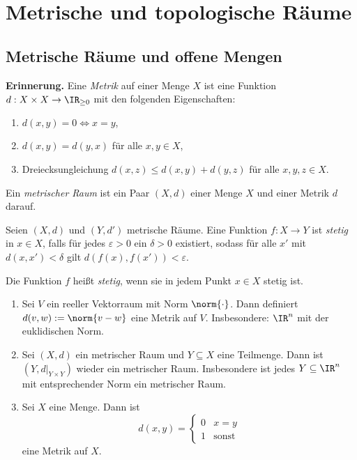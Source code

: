 \documentclass[language=ngerman]{TemplateLecture} %
\begin{document}
\chapter{Metrische und topologische Räume}
\section{Metrische Räume und offene Mengen}


\textbf{Erinnerung.} Eine \emph{Metrik} auf einer Menge $X$ ist eine Funktion $d: X \times X \to \IR_{\geq 0}$ mit den folgenden Eigenschaften:

\begin{enumerate}[$(i)$]
    \item $d(x,y) = 0 \Leftrightarrow x = y$,
    \item $d(x,y) = d(y,x)$ für alle $x,y \in X$,
    \item Dreiecksungleichung $d(x,z) \leq d(x,y) + d(y,z)$ für alle $x,y,z \in X$.
\end{enumerate}
Ein \emph{metrischer Raum} ist ein Paar $(X,d)$ einer Menge $X$ und einer Metrik $d$ darauf.

Seien $(X,d)$ und $(Y,d')$ metrische Räume. Eine Funktion $f: X \to Y$ ist \emph{stetig} in $x \in X$, falls für jedes $\varepsilon > 0$ ein $\delta > 0$ existiert, sodass für alle $x'$ mit $d(x,x') < \delta$ gilt $d(f(x),f(x')) < \varepsilon$.

Die Funktion $f$ heißt \emph{stetig}, wenn sie in jedem Punkt $x \in X$ stetig ist.

\begin{example} \leavevmode
    \begin{enumerate}[$(i)$]
        \item Sei $V$ ein reeller Vektorraum mit Norm $\norm{\cdot}$. Dann definiert $d(v,w) := \norm{v - w}$ eine Metrik auf $V$. Insbesondere: $\IR^n$ mit der euklidischen Norm.
        \item Sei $(X,d)$ ein metrischer Raum und $Y \subseteq X$ eine Teilmenge. Dann ist $(Y,d|_{Y \times Y})$ wieder ein metrischer Raum. Insbesondere ist jedes $Y \subseteq \IR^n$ mit entsprechender Norm ein metrischer Raum.
        \item Sei $X$ eine Menge. Dann ist 
        \begin{equation*}
            d(x,y) = \begin{cases}
                0 & x = y \\
                1 & \text{sonst}
            \end{cases}
        \end{equation*}
        eine Metrik auf $X$.
    \end{enumerate}
\end{example}
\end{document}
